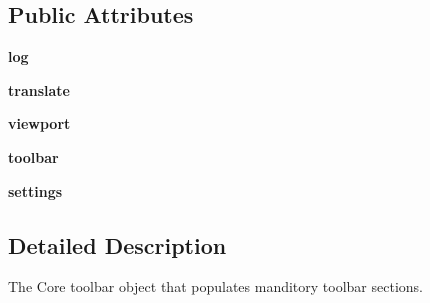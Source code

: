 \subsection*{Public Attributes}
\begin{DoxyCompactItemize}
\item 
\hypertarget{classcommotion__client_1_1GUI_1_1toolbar_1_1ToolBar_ac2987b2184e47fa5c08c1c753bafaa8b}{{\bfseries log}}\label{classcommotion__client_1_1GUI_1_1toolbar_1_1ToolBar_ac2987b2184e47fa5c08c1c753bafaa8b}

\item 
\hypertarget{classcommotion__client_1_1GUI_1_1toolbar_1_1ToolBar_a5ec3c619935f7e0626f9cb608be8e27f}{{\bfseries translate}}\label{classcommotion__client_1_1GUI_1_1toolbar_1_1ToolBar_a5ec3c619935f7e0626f9cb608be8e27f}

\item 
\hypertarget{classcommotion__client_1_1GUI_1_1toolbar_1_1ToolBar_a34d12135499302eef49fbe526cd0d66b}{{\bfseries viewport}}\label{classcommotion__client_1_1GUI_1_1toolbar_1_1ToolBar_a34d12135499302eef49fbe526cd0d66b}

\item 
\hypertarget{classcommotion__client_1_1GUI_1_1toolbar_1_1ToolBar_a30d7fa9d80355eb4d3d214cc0511de88}{{\bfseries toolbar}}\label{classcommotion__client_1_1GUI_1_1toolbar_1_1ToolBar_a30d7fa9d80355eb4d3d214cc0511de88}

\item 
\hypertarget{classcommotion__client_1_1GUI_1_1toolbar_1_1ToolBar_af5761f237999d6146ebe2e296306e5b7}{{\bfseries settings}}\label{classcommotion__client_1_1GUI_1_1toolbar_1_1ToolBar_af5761f237999d6146ebe2e296306e5b7}

\end{DoxyCompactItemize}


\subsection{Detailed Description}
\begin{DoxyVerb}The Core toolbar object that populates manditory toolbar sections.
\end{DoxyVerb}
 

